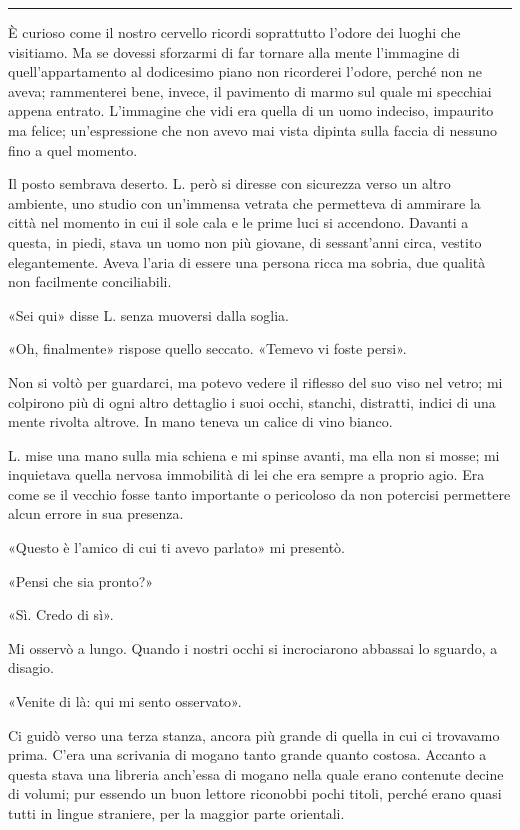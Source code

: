\documentclass[a4paper,10pt]{memoir}
\begin{document}
\plainbreak{1}

È curioso come il nostro cervello ricordi soprattutto l'odore dei luoghi che visitiamo. Ma se dovessi sforzarmi di far
tornare alla mente l'immagine di quell'appartamento al dodicesimo piano non ricorderei l'odore, perché non ne aveva;
rammenterei bene, invece, il pavimento di marmo sul quale mi specchiai appena entrato. L'immagine che vidi era quella di
un uomo indeciso, impaurito ma felice; un'espressione che non avevo mai vista dipinta sulla faccia di nessuno fino a
quel momento.

Il posto sembrava deserto. L. però si diresse con sicurezza verso un altro ambiente, uno studio con un'immensa vetrata
che permetteva di ammirare la città nel momento in cui il sole cala e le prime luci si accendono. Davanti a questa, in
piedi, stava un uomo non più giovane, di sessant'anni circa, vestito elegantemente. Aveva l'aria di essere una persona
ricca ma sobria, due qualità non facilmente conciliabili.

«Sei qui» disse L. senza muoversi dalla soglia.

«Oh, finalmente» rispose quello seccato. «Temevo vi foste persi».

Non si voltò per guardarci, ma potevo vedere il riflesso del suo viso nel vetro; mi colpirono più di ogni altro
dettaglio i suoi occhi, stanchi, distratti, indici di una mente rivolta altrove. In mano teneva un calice di vino
bianco.

L. mise una mano sulla mia schiena e mi spinse avanti, ma ella non si mosse; mi inquietava quella nervosa immobilità di
lei che era sempre a proprio agio. Era come se il vecchio fosse tanto importante o pericoloso da non potercisi
permettere alcun errore in sua presenza.

«Questo è l'amico di cui ti avevo parlato» mi presentò.

«Pensi che sia pronto?»

«Sì. Credo di sì».

Mi osservò a lungo. Quando i nostri occhi si incrociarono abbassai lo sguardo, a disagio.

«Venite di là: qui mi sento osservato».

Ci guidò verso una terza stanza, ancora più grande di quella in cui ci trovavamo prima. C'era una scrivania di mogano
tanto grande quanto costosa. Accanto a questa stava una libreria anch'essa di mogano nella quale erano contenute decine
di volumi; pur essendo un buon lettore riconobbi pochi titoli, perché erano quasi tutti in lingue straniere, per la
maggior parte orientali.
\end{document}
